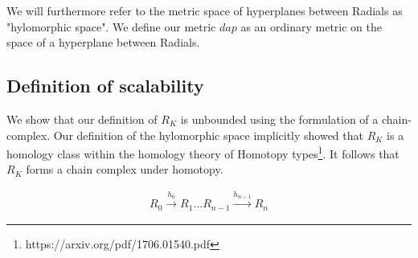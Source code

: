 \documentclass{article}
\begin{document}
We will furthermore refer to the metric space of hyperplanes between Radials as "hylomorphic space". We define our metric $dap$ as an ordinary metric on the space of a hyperplane between Radials.

\subsection{Definition of scalability}
We show that our definition of $R_K$ is unbounded using the formulation of a chain-complex. Our definition of the hylomorphic space implicitly showed that $R_K$ is a homology class within the homology theory of Homotopy types\footnote{https://arxiv.org/pdf/1706.01540.pdf}. It follows that $R_K$ forms a chain complex under homotopy. 

\begin{equation} \label{eq1}
\begin{split}
R_{0}{\xrightarrow {h_{0}}}R_{1} \dots R_{n-1}{\xrightarrow {h_{n-1}}}R_{n}
\end{split}
\end{equation}
\end{document}
